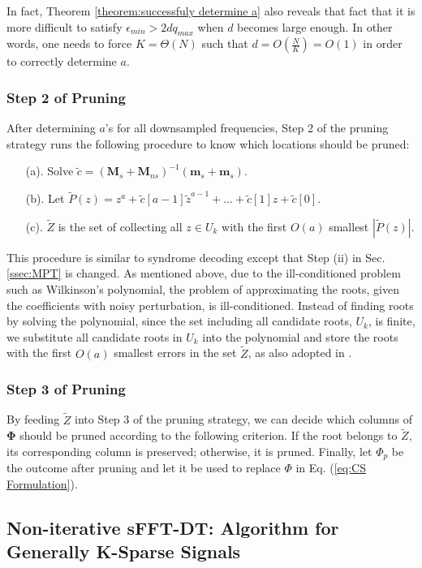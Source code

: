 \documentclass[journal,onecolumn,11pt]{IEEEtran}
\begin{document}
In fact, Theorem \ref{theorem:successfuly determine a} also reveals that fact that it is more difficult to satisfy $\epsilon_{min} > 2dq_{max} $ when $d$ becomes large enough.
In other words, one needs to force $K=\Theta(N)$ such that $d=O(\frac{N}{K})=O(1)$ in order to correctly determine $a$.

\subsubsection{Step 2 of Pruning}
After determining $a$'s for all downsampled frequencies, Step 2 of the pruning strategy runs the following procedure to know which locations should be pruned:
\begin{itemize}
  \item[(a).] Solve $ \tilde{c} = (\bm{M}_{s}+\bm{M}_{ns})^{-1}(\bm{m}_{s}+\bm{m}_{s})$.
  \item[(b).] Let $\tilde{P}(z)=z^{a}+\tilde{c}[a-1]\tilde{z}^{a-1}+...+\tilde{c}[1]z+\tilde{c}[0].$
  \item[(c).] $\tilde{Z}$ is the set of collecting all $z \in U_{k}$ with the first $O(a)$ smallest $|\tilde{P}(z)|$.
\end{itemize}
This procedure is similar to syndrome decoding except that Step (ii) in Sec. \ref{ssec:MPT} is changed.
As mentioned above, due to the ill-conditioned problem such as Wilkinson's polynomial, the problem of approximating the roots, given the coefficients with noisy perturbation, is ill-conditioned.
Instead of finding roots by solving the polynomial, since the set including all candidate roots, $U_{k}$, is finite, we substitute all candidate roots in $U_{k}$ into the polynomial and store the roots with the first $O(a)$ smallest errors in the set $\tilde{Z}$, as also adopted in \cite{Takos2008}.

\subsubsection{Step 3 of Pruning}
By feeding $\tilde{Z}$ into Step 3 of the pruning strategy, we can decide which columns of $\bm{\Phi}$ should be pruned according to the following criterion.
If the root belongs to $\tilde{Z}$, its corresponding column is preserved; otherwise, it is pruned.
Finally, let $\Phi_{p}$ be the outcome after pruning and let it be used to replace $\Phi$ in Eq. (\ref{eq:CS Formulation}).




\subsection{Non-iterative sFFT-DT: Algorithm for Generally K-Sparse Signals}\label{Sec: algorithm for general K sparse}
\end{document}
